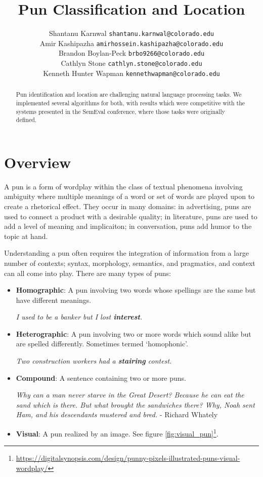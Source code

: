 \documentclass{article}
\title{Pun Classification and Location}
\author{
   Shantanu Karnwal \texttt{shantanu.karnwal@colorado.edu} \\
   \And Amir Kashipazha \texttt{amirhossein.kashipazha@colorado.edu} \\
   \And Brandon Boylan-Peck \texttt{brbo9266@colorado.edu} \\
   \And Cathlyn Stone \texttt{cathlyn.stone@colorado.edu} \\
   \And Kenneth Hunter Wapman \texttt{kennethwapman@colorado.edu} \\
}
\begin{document}
\maketitle

\begin{abstract}
	Pun identification and location are challenging natural language processing 
	tasks. We implemented several algorithms for both, with results which 
	were competitive with the systems presented in the SemEval conference, where
	those tasks were originally defined.
\end{abstract}


\section{Overview}
A pun is a form of wordplay within the class of textual phenomena involving
ambiguity where multiple meanings of a word or set of words are played upon to
create a rhetorical effect. They occur in many domains: in advertising, puns
are used to connect a product with a desirable quality; in literature, puns are
used to add a level of meaning and implicaiton; in conversation, puns add humor
to the topic at hand.

Understanding a pun often requires the integration of information from a large
number of contexts; syntax, morphology, semantics, and pragmatics, and context
can all come into play. There are many types of puns:

\begin{itemize}
	\item{\textbf{Homographic}: A pun involving two words whose spellings are
		the same but have different meanings.
		\begin{center}
		\emph{I used to be a banker but I lost \textbf{interest}.}
		\end{center}
	}
	\item{\textbf{Heterographic}: A pun involving two or more words which sound
		alike but are spelled differently. Sometimes termed `homophonic'.
		\begin{center}
		\emph{Two construction workers had a \textbf{stairing} contest.}
		\end{center}
	}
	\item{\textbf{Compound}: A sentence containing two or more puns.
		\begin{center}
		\emph{Why can a man never starve in the Great Desert? Because he can
		eat the sand which is there. But what brought the sandwiches there?
		Why, Noah sent Ham, and his descendants mustered and bred.} - Richard Whately
		\end{center}
	}
	\item{\textbf{Visual}: A pun realized by an image. See figure \ref{fig:visual_pun}\footnote{\url{https://digitalsynopsis.com/design/punny-pixels-illustrated-puns-visual-wordplay/}}.
	}
\end{itemize}
\end{document}
